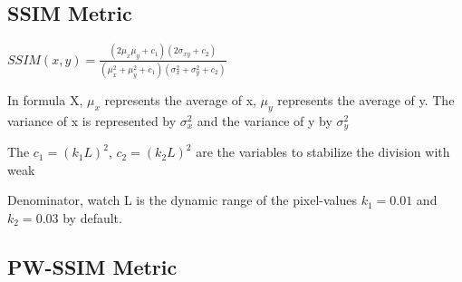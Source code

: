 \documentclass{acm_proc_article-sp}
\begin{document}




\subsection{SSIM Metric}
\begin{math}
SSIM(x, y) = \frac{(2\mu _{x}\mu _{y} + c _{1})(2\sigma _{xy}+c _{2})}{(\mu_{x}^{2}+\mu_{y}^{2}+ c_{1})(\sigma _{x}^{2}+\sigma _{y}^{2}+c _{2})}
\end{math}


In formula X,  $\mu_{x}$ represents the average of x,  $\mu_{y}$ represents the average of y. The variance of x is represented by $\sigma _{x}^{2}$ and the variance of y by $\sigma _{y}^{2}$

The $c_{1}=(k_{1}L)^{2}$, $c_{2}=(k_{2}L)^{2}$ are the variables to stabilize the division with weak

Denominator, watch L is the dynamic range of the pixel-values $k_{1}=0.01$ and $k_{2}=0.03$ by default.






\subsection{PW-SSIM Metric}
\end{document}
